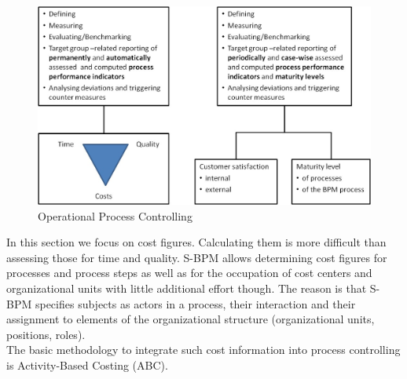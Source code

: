 \begin{figure}[htbp]
	\centering
	\includegraphics[width=0.6\linewidth] {Figures/Chapter5/ActivityBased/OpProcessCont.jpg}
	\caption[Operational Process Controlling]{Operational Process Controlling}
	\label{fig:OpProcessCont}
\end{figure}

In this section we focus on cost figures. Calculating them is more difficult than assessing those for time and quality. S-BPM allows determining cost figures for processes and process steps as well as for the occupation of cost centers and organizational units with little additional effort though. The reason is that S-BPM specifies subjects as actors in a process, their interaction and their assignment to elements of the organizational structure (organizational units, positions, roles).
\\
The basic methodology to integrate such cost information into process controlling is Activity-Based Costing (ABC).


